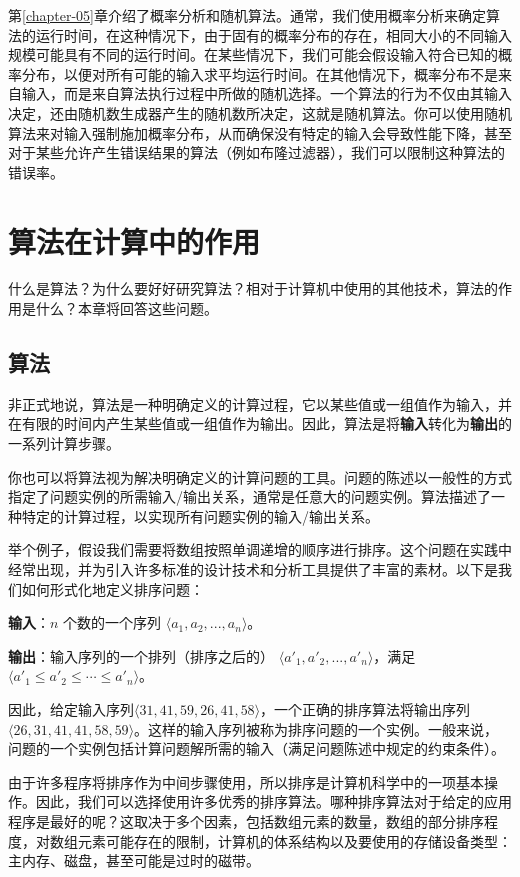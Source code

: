 \documentclass[lang=cn,newtx,10pt,scheme=chinese]{elegantbook}
\begin{document}
第\ref{chapter-05}章介绍了概率分析和随机算法。通常，我们使用概率分析来确定算法的运行时间，在这种情况下，由于固有的概率分布的存在，相同大小的不同输入规模可能具有不同的运行时间。在某些情况下，我们可能会假设输入符合已知的概率分布，以便对所有可能的输入求平均运行时间。在其他情况下，概率分布不是来自输入，而是来自算法执行过程中所做的随机选择。一个算法的行为不仅由其输入决定，还由随机数生成器产生的随机数所决定，这就是随机算法。你可以使用随机算法来对输入强制施加概率分布，从而确保没有特定的输入会导致性能下降，甚至对于某些允许产生错误结果的算法（例如布隆过滤器），我们可以限制这种算法的错误率。

\chapter{算法在计算中的作用}\label{chapter-01}

什么是算法？为什么要好好研究算法？相对于计算机中使用的其他技术，算法的作用是什么？本章将回答这些问题。

\section{算法}\label{section-1.1}

非正式地说，算法是一种明确定义的计算过程，它以某些值或一组值作为输入，并在有限的时间内产生某些值或一组值作为输出。因此，算法是将\textbf{输入}转化为\textbf{输出}的一系列计算步骤。

你也可以将算法视为解决明确定义的计算问题的工具。问题的陈述以一般性的方式指定了问题实例的所需输入/输出关系，通常是任意大的问题实例。算法描述了一种特定的计算过程，以实现所有问题实例的输入/输出关系。

举个例子，假设我们需要将数组按照单调递增的顺序进行排序。这个问题在实践中经常出现，并为引入许多标准的设计技术和分析工具提供了丰富的素材。以下是我们如何形式化地定义排序问题：

\textbf{输入}：$n$ 个数的一个序列 $\langle a_1, a_2, ..., a_n\rangle$。

\textbf{输出}：输入序列的一个排列（排序之后的） $\langle{a'_1,a'_2,...,a'_n}\rangle$，满足$\langle{a'_1\le a'_2\le \cdots\le a'_n}\rangle$。

因此，给定输入序列$\langle{31,41,59,26,41,58}\rangle$，一个正确的排序算法将输出序列 $\langle{26,31,41,41,58,59}\rangle$。这样的输入序列被称为排序问题的一个实例。一般来说，问题的一个实例包括计算问题解所需的输入（满足问题陈述中规定的约束条件）。

由于许多程序将排序作为中间步骤使用，所以排序是计算机科学中的一项基本操作。因此，我们可以选择使用许多优秀的排序算法。哪种排序算法对于给定的应用程序是最好的呢？这取决于多个因素，包括数组元素的数量，数组的部分排序程度，对数组元素可能存在的限制，计算机的体系结构以及要使用的存储设备类型：主内存、磁盘，甚至可能是过时的磁带。
\end{document}
